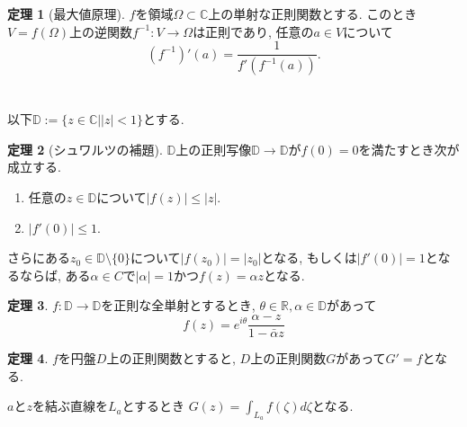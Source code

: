 \documentclass[dvipdfmx,a4paper,11pt]{article}
\newcommand{\R}{\mathbb{R}}
\newcommand{\C}{\mathbb{C}}
\newcommand{\D}{\mathbb{D}}
\theoremstyle{definition}
\newtheorem{thm}{定理}
\begin{document}
\begin{tcolorbox}[
    colback = white,
    colframe = green!35!black,
    fonttitle = \bfseries,
    breakable = true]
    \begin{thm}[最大値原理]
$f$を領域$\Omega \subset \C$上の単射な正則関数とする.
このとき$V = f(\Omega)$上の逆関数$f^{-1} : V \rightarrow \Omega$は正則であり, 任意の$a \in V$について
$$
(f^{-1})'(a) = \frac{1}{f'(f^{-1}(a))}.
$$

    \end{thm}
\end{tcolorbox}

\section{}
以下$\D := \{z \in \C | |z| <1  \}$とする. 
\begin{tcolorbox}[
    colback = white,
    colframe = green!35!black,
    fonttitle = \bfseries,
    breakable = true]
    \begin{thm}[シュワルツの補題]
    $\D$上の正則写像$\D \rightarrow \D$が$f(0)=0$を満たすとき次が成立する. 
    \begin{enumerate}
    \setlength{\parskip}{0cm} 
  \setlength{\itemsep}{0cm} 
  \item 任意の$z \in \D$について$|f(z)| \le |z|$.
  \item $|f' (0)| \le 1$.
  \end{enumerate}
  さらにある$z_0 \in \D \setminus \{ 0\}$について$|f(z_0)|=|z_0|$となる, もしくは$|f'(0)|=1$となるならば, ある$\alpha \in C$で$|\alpha|=1$かつ$f(z) = \alpha z$となる.
    \end{thm}
\end{tcolorbox}

\begin{tcolorbox}[
    colback = white,
    colframe = green!35!black,
    fonttitle = \bfseries,
    breakable = true]
    \begin{thm}
    $f : \D \rightarrow \D$を正則な全単射とするとき, $\theta \in \R, \alpha \in \D$があって
    $$
    f(z) = e^{i \theta} \frac{\alpha -z}{ 1 - \bar{\alpha}z}
    $$
    \end{thm}
\end{tcolorbox}


\begin{tcolorbox}[
    colback = white,
    colframe = green!35!black,
    fonttitle = \bfseries,
    breakable = true]
    \begin{thm}
$f$を円盤$D$上の正則関数とすると, $D$上の正則関数$G$があって$G' = f$となる. 
    \end{thm}
\end{tcolorbox}
$\text{$a$と$z$を結ぶ直線}$を$L_a$とするとき
$G (z)= \int _{L_a} f(\zeta) d\zeta$となる. 
\end{document}
